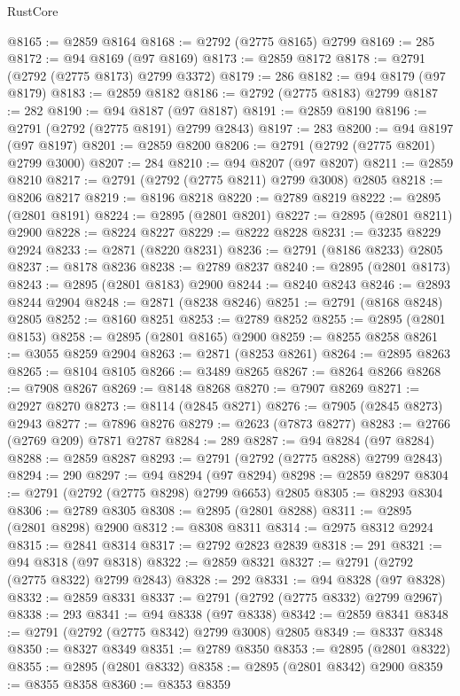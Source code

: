 \begin{lexlean}{RustCore}
\begin{coremodule}
@8165 := @2859 @8164
@8168 := @2792 (@2775 @8165) @2799
@8169 := 285
@8172 := @94 @8169 (@97 @8169)
@8173 := @2859 @8172
@8178 := @2791 (@2792 (@2775 @8173) @2799 @3372)
@8179 := 286
@8182 := @94 @8179 (@97 @8179)
@8183 := @2859 @8182
@8186 := @2792 (@2775 @8183) @2799
@8187 := 282
@8190 := @94 @8187 (@97 @8187)
@8191 := @2859 @8190
@8196 := @2791 (@2792 (@2775 @8191) @2799 @2843)
@8197 := 283
@8200 := @94 @8197 (@97 @8197)
@8201 := @2859 @8200
@8206 := @2791 (@2792 (@2775 @8201) @2799 @3000)
@8207 := 284
@8210 := @94 @8207 (@97 @8207)
@8211 := @2859 @8210
@8217 := @2791 (@2792 (@2775 @8211) @2799 @3008) @2805
@8218 := @8206 @8217
@8219 := @8196 @8218
@8220 := @2789 @8219
@8222 := @2895 (@2801 @8191)
@8224 := @2895 (@2801 @8201)
@8227 := @2895 (@2801 @8211) @2900
@8228 := @8224 @8227
@8229 := @8222 @8228
@8231 := @3235 @8229 @2924
@8233 := @2871 (@8220 @8231)
@8236 := @2791 (@8186 @8233) @2805
@8237 := @8178 @8236
@8238 := @2789 @8237
@8240 := @2895 (@2801 @8173)
@8243 := @2895 (@2801 @8183) @2900
@8244 := @8240 @8243
@8246 := @2893 @8244 @2904
@8248 := @2871 (@8238 @8246)
@8251 := @2791 (@8168 @8248) @2805
@8252 := @8160 @8251
@8253 := @2789 @8252
@8255 := @2895 (@2801 @8153)
@8258 := @2895 (@2801 @8165) @2900
@8259 := @8255 @8258
@8261 := @3055 @8259 @2904
@8263 := @2871 (@8253 @8261)
@8264 := @2895 @8263
@8265 := @8104 @8105
@8266 := @3489 @8265
@8267 := @8264 @8266
@8268 := @7908 @8267
@8269 := @8148 @8268
@8270 := @7907 @8269
@8271 := @2927 @8270
@8273 := @8114 (@2845 @8271)
@8276 := @7905 (@2845 @8273) @2943
@8277 := @7896 @8276
@8279 := @2623 (@7873 @8277)
@8283 := @2766 (@2769 @209) @7871 @2787
@8284 := 289
@8287 := @94 @8284 (@97 @8284)
@8288 := @2859 @8287
@8293 := @2791 (@2792 (@2775 @8288) @2799 @2843)
@8294 := 290
@8297 := @94 @8294 (@97 @8294)
@8298 := @2859 @8297
@8304 := @2791 (@2792 (@2775 @8298) @2799 @6653) @2805
@8305 := @8293 @8304
@8306 := @2789 @8305
@8308 := @2895 (@2801 @8288)
@8311 := @2895 (@2801 @8298) @2900
@8312 := @8308 @8311
@8314 := @2975 @8312 @2924
@8315 := @2841 @8314
@8317 := @2792 @2823 @2839
@8318 := 291
@8321 := @94 @8318 (@97 @8318)
@8322 := @2859 @8321
@8327 := @2791 (@2792 (@2775 @8322) @2799 @2843)
@8328 := 292
@8331 := @94 @8328 (@97 @8328)
@8332 := @2859 @8331
@8337 := @2791 (@2792 (@2775 @8332) @2799 @2967)
@8338 := 293
@8341 := @94 @8338 (@97 @8338)
@8342 := @2859 @8341
@8348 := @2791 (@2792 (@2775 @8342) @2799 @3008) @2805
@8349 := @8337 @8348
@8350 := @8327 @8349
@8351 := @2789 @8350
@8353 := @2895 (@2801 @8322)
@8355 := @2895 (@2801 @8332)
@8358 := @2895 (@2801 @8342) @2900
@8359 := @8355 @8358
@8360 := @8353 @8359

\end{coremodule}
\end{lexlean}
